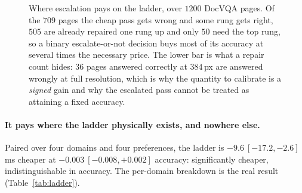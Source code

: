 \documentclass[10pt,twocolumn]{article}
\theoremstyle{plain}
\begin{document}
\begin{figure}[t]
\centering
{}
\caption{Where escalation pays on the ladder, over $1200$ DocVQA pages. Of the
$709$ pages the cheap pass gets wrong and some rung gets right, $505$ are
already repaired one rung up and only $50$ need the top rung, so a binary
escalate-or-not decision buys most of its accuracy at several times the
necessary price. The lower bar is what a repair count hides: $36$ pages
answered correctly at $384$\,px are answered wrongly at full resolution, which
is why the quantity to calibrate is a \emph{signed} gain and why the escalated
pass cannot be treated as attaining a fixed accuracy.}
\label{fig:repairs}
\end{figure}


\paragraph{It pays where the ladder physically exists, and nowhere else.}
Paired over four domains and four preferences, the ladder is
$-9.6\ [-17.2,-2.6]$\,ms cheaper at $-0.003\ [-0.008,+0.002]$ accuracy:
significantly cheaper, indistinguishable in accuracy. The per-domain breakdown
is the real result (Table~\ref{tab:ladder}).
\end{document}
